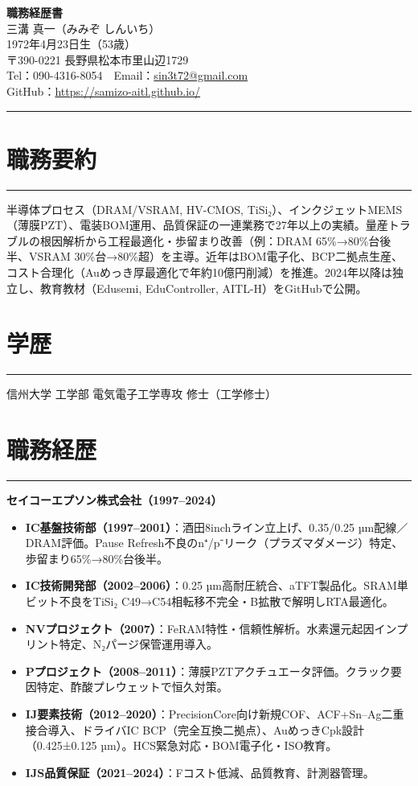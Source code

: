 \documentclass[11pt]{bxjsarticle}
\newcommand{\cvsection}[1]{\section*{#1}\vspace{-0.3em}\hrule\vspace{0.5em}}
\begin{document}
\begin{center}
{\Huge \textbf{職務経歴書}} \\[1.2em]
{\Large 三溝 真一（みみぞ しんいち）} \\[0.5em]
1972年4月23日生（53歳） \\[0.3em]
〒390-0221 長野県松本市里山辺1729 \\[0.3em]
Tel：090-4316-8054　Email：\href{mailto:sin3t72@gmail.com}{sin3t72@gmail.com} \\[0.3em]
GitHub：\href{https://samizo-aitl.github.io/}{https://samizo-aitl.github.io/}
\end{center}

\vspace{1em}
\hrule
\vspace{1em}

\cvsection{職務要約}
半導体プロセス（DRAM/VSRAM, HV-CMOS, TiSi₂）、インクジェットMEMS（薄膜PZT）、電装BOM運用、品質保証の一連業務で27年以上の実績。量産トラブルの根因解析から工程最適化・歩留まり改善（例：DRAM 65\%→80\%台後半、VSRAM 30\%台→80\%超）を主導。近年はBOM電子化、BCP二拠点生産、コスト合理化（Auめっき厚最適化で年約10億円削減）を推進。2024年以降は独立し、教育教材（Edusemi, EduController, AITL-H）をGitHubで公開。

\cvsection{学歴}
信州大学 工学部 電気電子工学専攻 修士（工学修士）

\cvsection{職務経歴}
\textbf{セイコーエプソン株式会社（1997–2024）}

\begin{itemize}
  \item \textbf{IC基盤技術部（1997–2001）}：酒田8inchライン立上げ、0.35/0.25 µm配線／DRAM評価。Pause Refresh不良のn⁺/p⁻リーク（プラズマダメージ）特定、歩留まり65\%→80\%台後半。
  \item \textbf{IC技術開発部（2002–2006）}：0.25 µm高耐圧統合、aTFT製品化。SRAM単ビット不良をTiSi₂ C49→C54相転移不完全・B拡散で解明しRTA最適化。
  \item \textbf{NVプロジェクト（2007）}：FeRAM特性・信頼性解析。水素還元起因インプリント特定、N₂パージ保管運用導入。
  \item \textbf{Pプロジェクト（2008–2011）}：薄膜PZTアクチュエータ評価。クラック要因特定、酢酸プレウェットで恒久対策。
  \item \textbf{IJ要素技術（2012–2020）}：PrecisionCore向け新規COF、ACF+Sn–Ag二重接合導入、ドライバIC BCP（完全互換二拠点）、AuめっきCpk設計（0.425±0.125 µm）。HCS緊急対応・BOM電子化・ISO教育。
  \item \textbf{IJS品質保証（2021–2024）}：Fコスト低減、品質教育、計測器管理。
\end{itemize}
\end{document}
